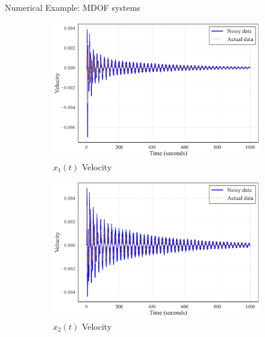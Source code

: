 \documentclass{beamer}
\begin{document}
\begin{frame}{Numerical Example: MDOF systems}
\begin{figure}[!ht]
    \vspace{0.5em}%
    \begin{subfigure}{0.31\textwidth}
        \centering
        \includegraphics[width=\textwidth]{noised_Velocity_vs_actual_mass_1.pdf}
        \caption{ $x_1(t)$ Velocity}
    \end{subfigure}
    \hspace{0.5em}%
    \begin{subfigure}{0.31\textwidth}
        \centering
        \includegraphics[width=\textwidth]{noised_Velocity_vs_actual_mass_2.pdf}
        \caption{$x_2(t)$ Velocity}
    \end{subfigure}
    \hspace{0.5em}%
    \begin{subfigure}{0.31\textwidth}
      \centering

\end{subfigure}
\end{figure}
\end{frame}
\end{document}
